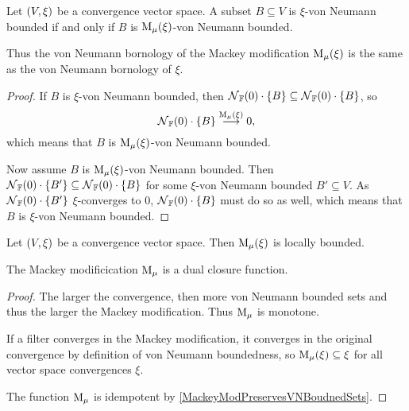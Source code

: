 \begin{lemma} \label{MackeyModPreservesVNBoudnedSets}
Let $\sSet{V,\xi}$ be a convergence vector space. A subset $B\subseteq V$ is $\xi$-von Neumann bounded \textup{if and only if} $B$ is $\operatorname{M_\mu}(\xi)$-von Neumann bounded.
\end{lemma}
Thus the von Neumann bornology of the Mackey modification $\operatorname{M_\mu}(\xi)$ is the same as the von Neumann bornology of $\xi$.
\begin{proof}
If $B$ is $\xi$-von Neumann bounded, then $\operatorname{\mathcal{N}}_{\mathbb{F}}(0)\cdot\{B\} \subseteq \operatorname{\mathcal{N}}_{\mathbb{F}}(0)\cdot\{B\}$, so
\[ \operatorname{\mathcal{N}}_{\mathbb{F}}(0)\cdot\{B\} \overset{\operatorname{M_\mu}(\xi)}{\longrightarrow} 0, \]
which means that $B$ is $\operatorname{M_\mu}(\xi)$-von Neumann bounded.

Now assume $B$ is $\operatorname{M_\mu}(\xi)$-von Neumann bounded. Then $\operatorname{\mathcal{N}}_{\mathbb{F}}(0)\cdot\{B'\} \subseteq \operatorname{\mathcal{N}}_{\mathbb{F}}(0)\cdot\{B\}$ for some $\xi$-von Neumann bounded $B'\subseteq V$. As $\operatorname{\mathcal{N}}_{\mathbb{F}}(0)\cdot\{B'\}$ $\xi$-converges to $0$, $\operatorname{\mathcal{N}}_{\mathbb{F}}(0)\cdot\{B\}$ must do so as well, which means that $B$ is $\xi$-von Neumann bounded.
\end{proof}
\begin{corollary} \label{MackeyModLocallyBounded}
Let $\sSet{V,\xi}$ be a convergence vector space. Then $\operatorname{M_\mu}(\xi)$ is locally bounded.
\end{corollary}

\begin{lemma}
The Mackey modificication $\operatorname{M_\mu}$ is a dual closure function.
\end{lemma}
\begin{proof}
The larger the convergence, then more von Neumann bounded sets and thus the larger the Mackey modification. Thus $\operatorname{M_\mu}$ is monotone.

If a filter converges in the Mackey modification, it converges in the original convergence by definition of von Neumann boundedness, so $\operatorname{M_\mu}(\xi)\subseteq \xi$ for all vector space convergences $\xi$.

The function $\operatorname{M_\mu}$ is idempotent by \ref{MackeyModPreservesVNBoudnedSets}.
\end{proof}

